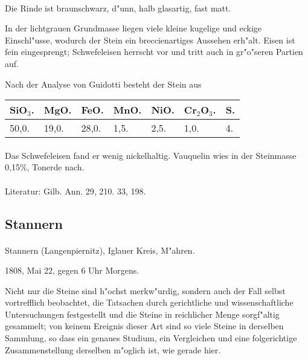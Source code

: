 \documentclass[a4paper, 11pt, oneside]{article}
\begin{document}
\paragraph{}
Die Rinde ist braunschwarz, d"unn, halb glasartig, fast matt.

In der lichtgrauen Grundmasse liegen viele kleine kugelige und eckige Einschl"usse, wodurch der Stein ein breccienartiges Aussehen erh"alt. Eisen ist fein eingesprengt; Schwefeleisen herrscht vor und tritt auch in gr"o"seren Partien auf.

Nach der Analyse von Guidotti besteht der Stein aus
\begin{table}[!ht]
    \centering
    \begin{tabular}{l l l l l l l}
        SiO$_{3}$. & MgO. & FeO. & MnO. & NiO. & Cr$_{2}$O$_{3}$. & S. \\ \hline
        50,0. & 19,0. & 28,0. & 1,5. & 2,5. & 1,0. & 4. \\
    \end{tabular}
\end{table}
\paragraph{}
Das Schwefeleisen fand er wenig nickelhaltig. Vauquelin wies in der Steinmasse 0,15\%, Tonerde nach.
\footnotesize
\paragraph{}
Literatur: Gilb. Ann. 29, 210. 33, 198.
\subsection{Stannern}
\normalsize
\paragraph{}
Stannern (Langenpiernitz), Iglauer Kreis, M"ahren.

1808, Mai 22, gegen 6 Uhr Morgens.

Nicht nur die Steine sind h"ochst merkw"urdig, sondern auch der Fall selbst vortrefflich beobachtet, die Tatsachen durch gerichtliche und wissenschaftliche Untersuchungen festgestellt und die Steine in reichlicher Menge sorgf"altig gesammelt; von keinem Ereignis dieser Art sind so viele Steine in derselben Sammlung, so dass ein genaues Studium, ein Vergleichen und eine folgerichtige Zusammenstellung derselben m"oglich ist, wie gerade hier.
\end{document}
